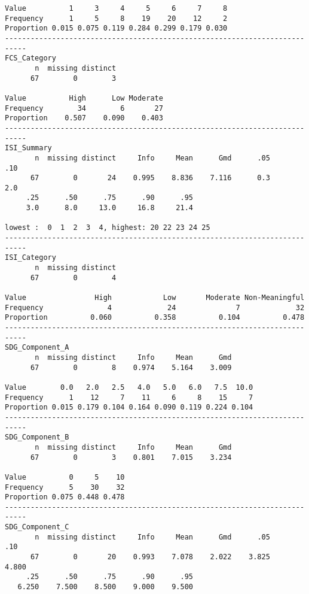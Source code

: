 \documentclass[]{article}
\begin{document}
\begin{verbatim}
Value          1     3     4     5     6     7     8
Frequency      1     5     8    19    20    12     2
Proportion 0.015 0.075 0.119 0.284 0.299 0.179 0.030
---------------------------------------------------------------------------
FCS_Category 
       n  missing distinct 
      67        0        3 
                                     
Value          High      Low Moderate
Frequency        34        6       27
Proportion    0.507    0.090    0.403
---------------------------------------------------------------------------
ISI_Summary 
       n  missing distinct     Info     Mean      Gmd      .05      .10 
      67        0       24    0.995    8.836    7.116      0.3      2.0 
     .25      .50      .75      .90      .95 
     3.0      8.0     13.0     16.8     21.4 

lowest :  0  1  2  3  4, highest: 20 22 23 24 25
---------------------------------------------------------------------------
ISI_Category 
       n  missing distinct 
      67        0        4 
                                                                      
Value                High            Low       Moderate Non-Meaningful
Frequency               4             24              7             32
Proportion          0.060          0.358          0.104          0.478
---------------------------------------------------------------------------
SDG_Component_A 
       n  missing distinct     Info     Mean      Gmd 
      67        0        8    0.974    5.164    3.009 
                                                          
Value        0.0   2.0   2.5   4.0   5.0   6.0   7.5  10.0
Frequency      1    12     7    11     6     8    15     7
Proportion 0.015 0.179 0.104 0.164 0.090 0.119 0.224 0.104
---------------------------------------------------------------------------
SDG_Component_B 
       n  missing distinct     Info     Mean      Gmd 
      67        0        3    0.801    7.015    3.234 
                            
Value          0     5    10
Frequency      5    30    32
Proportion 0.075 0.448 0.478
---------------------------------------------------------------------------
SDG_Component_C 
       n  missing distinct     Info     Mean      Gmd      .05      .10 
      67        0       20    0.993    7.078    2.022    3.825    4.800 
     .25      .50      .75      .90      .95 
   6.250    7.500    8.500    9.000    9.500 
                                                                      

\end{verbatim}
\end{document}
